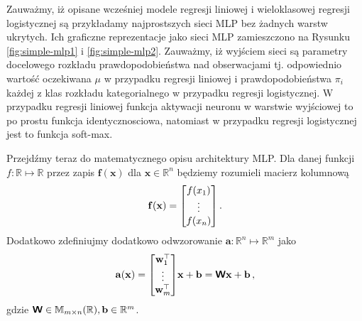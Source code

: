 \documentclass{myclass}
\begin{document}
\begin{figure}
\centering
{}
\end{figure}

Zauważmy, iż opisane wcześniej modele regresji liniowej i wieloklasowej regresji logistycznej są
przykładamy najprostszych sieci MLP bez żadnych warstw ukrytych. Ich graficzne reprezentacje jako
sieci MLP zamieszczono na Rysunku \ref{fig:simple-mlp1} i \ref{fig:simple-mlp2}. Zauważmy, iż
wyjściem sieci są parametry docelowego rozkładu prawdopodobieństwa nad obserwacjami tj. odpowiednio
wartość oczekiwana \(\mu\) w przypadku regresji liniowej i prawdopodobieństwa \(\pi_i\) każdej z
klas rozkładu kategorialnego w przypadku regresji logistycznej. W przypadku regresji liniowej
funkcja aktywacji neuronu w warstwie wyjściowej to po prostu funkcja identycznosciowa, natomiast w
przypadku regresji logistycznej jest to funkcja soft-max.

Przejdźmy teraz do matematycznego opisu architektury MLP. Dla danej funkcji
\(f:\mathbb{R}\mapsto\mathbb{R}\) przez zapis \(\mathbf{f}(\mathbf{x})\) dla \(\mathbf{x} \in
\mathbb{R}^n\) będziemy rozumieli macierz kolumnową
\begin{equation*}
    \mathbf{f}(\mathbf{x}) = \mqty[f(x_1) \\ \vdots \\ f(x_n)]\,.
\end{equation*}
Dodatkowo zdefiniujmy dodatkowo odwzorowanie \(\mathbf{a}: \mathbb{R}^n \mapsto \mathbb{R}^m\) jako
\begin{equation*}
    \mathbf{a}(\mathbf{x}) = \mqty[\mathbf{w}_1^{\top} \\ \vdots \\ \mathbf{w}_m^{\top}]\mathbf{x} + \mathbf{b} = \oper{W}\mathbf{x} + \mathbf{b}\,,
\end{equation*}
gdzie \(\boldsymbol{\mathsf{W}} \in \mathbb{M}_{m\times n}(\mathbb{R}), \mathbf{b} \in \mathbb{R}^m\).
\end{document}
